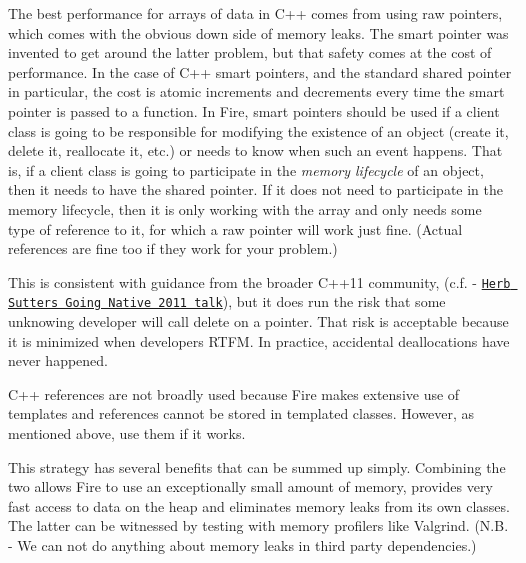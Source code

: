 The best performance for arrays of data in C++ comes from using raw pointers, which comes with the obvious down side of memory leaks. The smart pointer was invented to get around the latter problem, but that safety comes at the cost of performance. In the case of C++ smart pointers, and the standard shared pointer in particular, the cost is atomic increments and decrements every time the smart pointer is passed to a function. In Fire, smart pointers should be used if a client class is going to be responsible for modifying the existence of an object (create it, delete it, reallocate it, etc.) or needs to know when such an event happens. That is, if a client class is going to participate in the {\itshape memory lifecycle} of an object, then it needs to have the shared pointer. If it does not need to participate in the memory lifecycle, then it is only working with the array and only needs some type of reference to it, for which a raw pointer will work just fine. (Actual references are fine too if they work for your problem.)

This is consistent with guidance from the broader C++11 community, (c.\+f. -\/ \href{http://channel9.msdn.com/Events/GoingNative/GoingNative-2012/C-11-VC-11-and-Beyond}{\tt Herb Sutter\textquotesingle{}s Going Native 2011 talk}), but it does run the risk that some unknowing developer will call delete on a pointer. That risk is acceptable because it is minimized when developers R\+T\+FM. In practice, accidental deallocations have never happened.

C++ references are not broadly used because Fire makes extensive use of templates and references cannot be stored in templated classes. However, as mentioned above, use them if it works.

This strategy has several benefits that can be summed up simply. Combining the two allows Fire to use an exceptionally small amount of memory, provides very fast access to data on the heap and eliminates memory leaks from its own classes. The latter can be witnessed by testing with memory profilers like Valgrind. (N.\+B. -\/ We can not do anything about memory leaks in third party dependencies.) 
